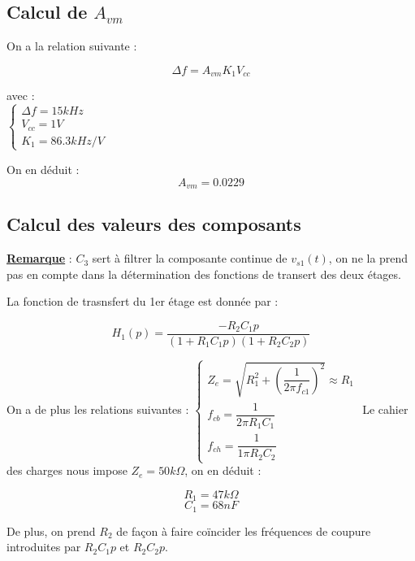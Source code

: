 \documentclass[a4paper]{report}
\begin{document}
\subsection{Calcul de $A_{vm}$}

On a la relation suivante :

$$\Delta f = A_{vm}K_1V_{cc}$$

avec :\\


$\left\{
\begin{array}{l}
  \Delta f = 15kHz\\
  V_{cc} = 1V\\
  K_1 = 86.3kHz/V
\end{array}
\right.$

On en déduit : 
$$A_{vm} = 0.0229$$

\subsection{Calcul des valeurs des composants}

\textbf{\underline{Remarque}} :
\newline
\newline
$C_3$ sert à filtrer la composante continue de $v_{s1}(t)$, on ne la prend pas en compte dans la détermination des fonctions de transert des deux étages. 
\newline
\newline

La fonction de trasnsfert du 1er étage est donnée par :

$$H_1(p) = \dfrac{-R_2C_1p}{(1+R_1C_1p)(1+R_2C_2p)}$$

On a de plus les relations suivantes :
\newline
\newline
$\left\{
\begin{array}{l}
  Z_e = \sqrt{R_1^2 + (\dfrac{1}{2\pi f_{c1}})^2} \approx R_1 \\
  f_{cb} = \dfrac{1}{2\pi R_1C_1}\\
  f_{ch} = \dfrac{1}{1\pi R_2C_2}
\end{array}
\right.$
\newline
\newline
Le cahier des charges nous impose $Z_e = 50k\Omega$, on en déduit :

$$R_1 = 47k\Omega$$
$$C_1 = 68nF$$

De plus, on prend $R_2$ de façon à faire coïncider les fréquences de coupure introduites par $R_2C_1p$ et $R_2C_2p$.
\end{document}
